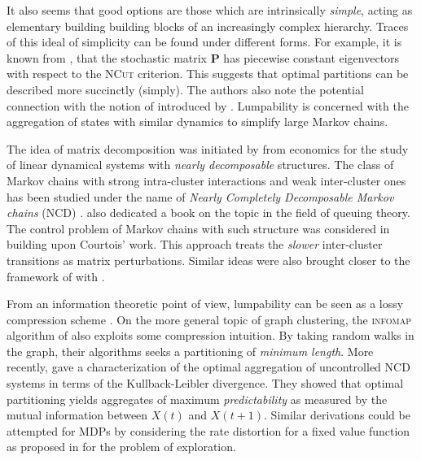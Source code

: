 It also seems that good options are those which are intrinsically \textit{simple}, acting as
elementary building building blocks of an increasingly complex hierarchy. Traces of this
ideal of simplicity can be found under different forms. For example, it is
known from \parencite{Shi2001}, that the stochastic matrix $\mathbf{P}$ has piecewise constant
eigenvectors with respect to the \textsc{NCut} criterion. This suggests that optimal
partitions can be described more succinctly (simply). The authors also note the
potential connection with the notion of  introduced by
\cite{Kemeny1976}. Lumpability is concerned with the aggregation of states with similar
dynamics to simplify large Markov chains. 

The idea of matrix decomposition was initiated by \cite{AndoFisher1963} from
economics for the study of linear dynamical systems with \textit{nearly decomposable}
structures. The class of Markov chains with strong intra-cluster interactions and weak
inter-cluster ones has been studied under the name of \textit{Nearly Completely
Decomposable Markov chains} (NCD) \parencite{Gaitsgori1975}.
\cite{Courtois1977} also dedicated a book on the topic in the field of queuing theory. The control problem of Markov chains
with such structure was considered in \cite{Teneketzis1980, Delebecque1981,
Phillips1981, Coderch1983} building upon Courtois' work. This approach treats the \textit{slower} inter-cluster transitions as
matrix perturbations. Similar ideas were also brought closer to the framework of \mdps
with \cite{Haviv1985, Aldhaheri1991, Zhang1997}. 

From an information theoretic point of view, lumpability can be seen as a lossy
compression scheme \parencite{ Watanabe1960, Lindqvist1978}. On the more general
topic of graph clustering, the  \textsc{infomap} algorithm of \cite{Rosvall2008} also
exploits some compression intuition. By taking random walks in the graph, their
algorithms seeks a partitioning of \textit{minimum length}. More recently,
\cite{Deng2011} gave a characterization of the optimal aggregation of uncontrolled NCD systems in
terms of the Kullback-Leibler divergence. They showed that optimal partitioning yields
aggregates of maximum \textit{predictability} as measured by the mutual information
between $X(t)$ and $X(t+1)$. Similar derivations could be attempted for MDPs by considering the rate distortion for a fixed value function as proposed in  \cite{Still2012} for the problem of exploration.